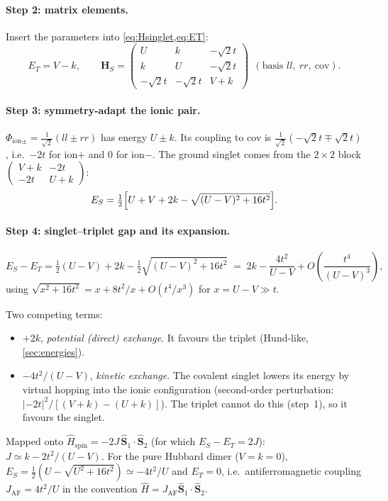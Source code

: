 \paragraph{Step 2: matrix elements.} Insert the parameters into \cref{eq:Hsinglet,eq:ET}:
\begin{equation}
  E_T=V-k,\qquad
  \mathbf H_S=\begin{pmatrix}U&k&-\sqrt2t\\k&U&-\sqrt2t\\-\sqrt2t&-\sqrt2t&V+k\end{pmatrix}
  \ \ (\text{basis } ll,\ rr,\ \text{cov}).
\end{equation}

\paragraph{Step 3: symmetry-adapt the ionic pair.} $\Phi_{\text{ion}\pm}=\tfrac1{\sqrt2}(ll\pm rr)$ has
energy $U\pm k$. Its coupling to cov is $\tfrac1{\sqrt2}(-\sqrt2t\mp\sqrt2t)$, i.e.\ $-2t$ for ion$+$ and
$0$ for ion$-$. The ground singlet comes from the $2\times2$ block
$\begin{pmatrix}V+k&-2t\\-2t&U+k\end{pmatrix}$:
\begin{equation}\label{eq:ES_ext}
  E_S=\tfrac12\Bigl[U+V+2k-\sqrt{(U-V)^2+16t^2}\Bigr].
\end{equation}

\paragraph{Step 4: singlet--triplet gap and its expansion.}
\begin{equation}\label{eq:gap_ext}
  E_S-E_T=\tfrac12(U-V)+2k-\tfrac12\sqrt{(U-V)^2+16t^2}
  \;=\;2k-\frac{4t^2}{U-V}+O\!\left(\frac{t^4}{(U-V)^3}\right),
\end{equation}
using $\sqrt{x^2+16t^2}=x+8t^2/x+O(t^4/x^3)$ for $x=U-V\gg t$.

\begin{resultbox}
Two competing terms:
\begin{itemize}
  \item $+2k$, \emph{potential (direct) exchange}. It favours the triplet (Hund-like, \cref{sec:energies}).
  \item $-4t^2/(U-V)$, \emph{kinetic exchange}. The covalent singlet lowers its energy by virtual hopping into the
        ionic configuration (second-order perturbation: $|{-2t}|^2/[(V+k)-(U+k)]$). The triplet cannot do this
        (step~1), so it favours the singlet.
\end{itemize}
Mapped onto $\hat H_{\text{spin}}=-2J\,\hat{\mathbf S}_1\cdot\hat{\mathbf S}_2$ (for which $E_S-E_T=2J$):
$J\simeq k-2t^2/(U-V)$. For the pure Hubbard dimer ($V=k=0$), $E_S=\tfrac12(U-\sqrt{U^2+16t^2})\simeq-4t^2/U$
and $E_T=0$, i.e.\ antiferromagnetic coupling $J_{\text{AF}}=4t^2/U$ in the convention
$\hat H=J_{\text{AF}}\hat{\mathbf S}_1\cdot\hat{\mathbf S}_2$.
\end{resultbox}

